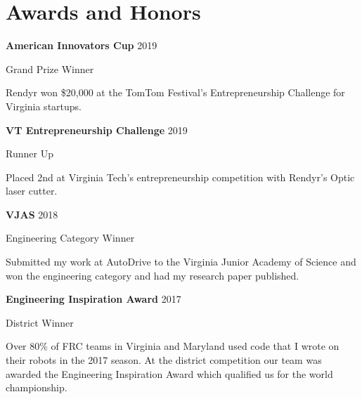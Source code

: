 \section{Awards and Honors}
\begin{small}
\parbox[t][][t]{\linewidth}{
	\parbox{\linewidth}{\textbf{American Innovators Cup} \hfill {{2019}}}
	\parbox{\linewidth}{Grand Prize Winner}
	\smallbreak
	\smallskip
	Rendyr won \$20,000 at the TomTom Festival's Entrepreneurship Challenge for Virginia startups.
	\bigbreak
	\smallskip
}

\parbox[t][][t]{\linewidth}{
	\parbox{\linewidth}{\textbf{VT Entrepreneurship Challenge} \hfill {{2019}}}
	\parbox{\linewidth}{Runner Up}
	\smallbreak
	\smallskip
	Placed 2nd at Virginia Tech's entrepreneurship competition with Rendyr's Optic laser cutter.
	\bigbreak
	\smallskip
}

\parbox[t][][t]{\linewidth}{
	\parbox{\linewidth}{\textbf{VJAS} \hfill {{2018}}}
	\parbox{\linewidth}{Engineering Category Winner}
	\smallbreak
	\smallskip
	Submitted my work at AutoDrive to the Virginia Junior Academy of Science and won the engineering category and had my research paper published.
	\bigbreak
	\smallskip
}

\parbox[t][][t]{\linewidth}{
	\parbox{\linewidth}{\textbf{Engineering Inspiration Award} \hfill {{2017}}}
	\parbox{\linewidth}{District Winner}
	\smallbreak
	\smallskip
	Over 80\% of FRC teams in Virginia and Maryland used code that I wrote on their robots in the 2017 season. At the district competition our team was awarded the Engineering Inspiration Award which qualified us for the world championship.
	\bigbreak
	\smallskip
}
\end{small}